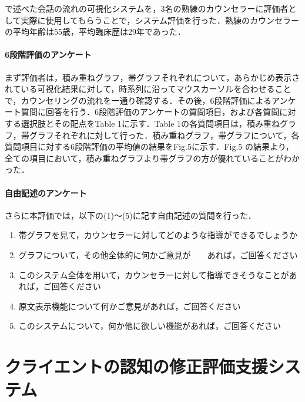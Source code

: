 \documentclass[shuuron]{kuee}
\begin{document}
で述べた会話の流れの可視化システムを，3名の熟練のカウンセラーに評価者として実際に使用してもらうことで，システム評価を行った．熟練のカウンセラーの平均年齢は55歳，平均臨床歴は29年であった．

\subsubsection{6段階評価のアンケート}

まず評価者は，積み重ねグラフ，帯グラフそれぞれについて，あらかじめ表示されている可視化結果に対して，時系列に沿ってマウスカーソルを合わせることで，カウンセリングの流れを一通り確認する．その後，6段階評価によるアンケート質問に回答を行う．6段階評価のアンケートの質問項目，および各質問に対する選択肢とその配点をTable 1に示す．Table 1の各質問項目は，積み重ねグラフ，帯グラフそれぞれに対して行った．積み重ねグラフ，帯グラフについて，各質問項目に対する6段階評価の平均値の結果をFig.5に示す．Fig.5 の結果より，全ての項目において，積み重ねグラフより帯グラフの方が優れていることがわかった．

\subsubsection{自由記述のアンケート}


さらに本評価では，以下の(1)～(5)に記す自由記述の質問を行った．



\begin{enumerate}
 \item 帯グラフを見て，カウンセラーに対してどのような指導ができるでしょうか
 \item グラフについて，その他全体的に何かご意見が　　あれば，ご回答ください
 \item このシステム全体を用いて，カウンセラーに対して指導できそうなことがあれば，ご回答ください
 \item 原文表示機能について何かご意見があれば，ご回答ください
 \item このシステムについて，何か他に欲しい機能があれば，ご回答ください
\end{enumerate}









\chapter{クライエントの認知の修正評価支援システム}
\end{document}
